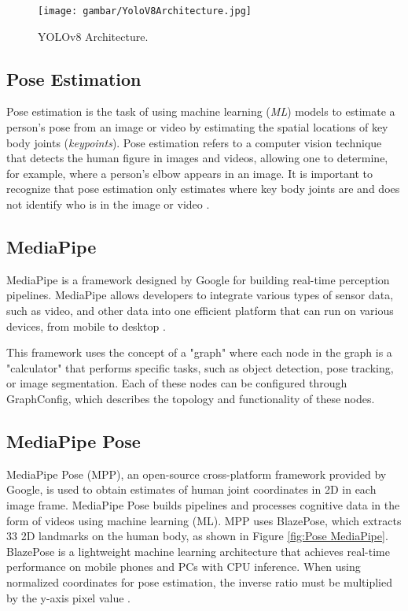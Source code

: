 \begin{figure}[H]
  \centering

  \texttt{[image: gambar/YoloV8Architecture.jpg]}

  \caption{YOLOv8 Architecture.}
  \label{fig:Arsitektur Yolov8}
\end{figure}


\subsection{Pose Estimation}
Pose estimation is the task of using machine learning (\emph{ML}) models to estimate a person's pose from an image or video by estimating the spatial locations of key body joints (\emph{keypoints}). Pose estimation refers to a computer vision technique that detects the human figure in images and videos, allowing one to determine, for example, where a person's elbow appears in an image. It is important to recognize that pose estimation only estimates where key body joints are and does not identify who is in the image or video \cite{tensorflow2015-whitepaper}.

\subsection{MediaPipe}
MediaPipe is a framework designed by Google for building real-time perception pipelines. MediaPipe allows developers to integrate various types of sensor data, such as video, and other data into one efficient platform that can run on various devices, from mobile to desktop \cite{MediaPipe}.

This framework uses the concept of a "graph" where each node in the graph is a "calculator" that performs specific tasks, such as object detection, pose tracking, or image segmentation. Each of these nodes can be configured through GraphConfig, which describes the topology and functionality of these nodes.

\subsection{MediaPipe Pose}
MediaPipe Pose (MPP), an open-source cross-platform framework provided by Google, is used to obtain estimates of human joint coordinates in 2D in each image frame. MediaPipe Pose builds pipelines and processes cognitive data in the form of videos using machine learning (ML). MPP uses BlazePose, which extracts 33 2D landmarks on the human body, as shown in Figure \ref{fig:Pose MediaPipe}. BlazePose is a lightweight machine learning architecture that achieves real-time performance on mobile phones and PCs with CPU inference. When using normalized coordinates for pose estimation, the inverse ratio must be multiplied by the y-axis pixel value \cite{MediapipePose}.

